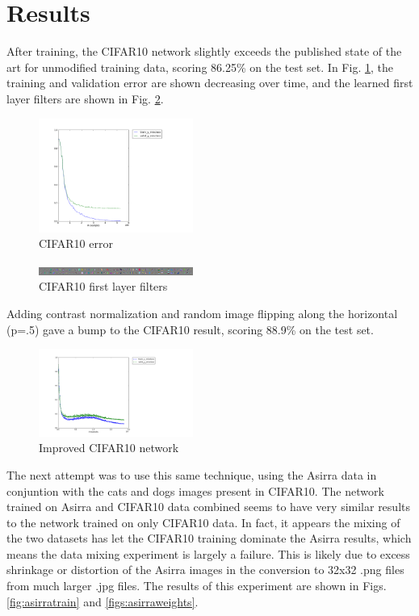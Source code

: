 \documentclass[journal]{IEEEtran}
\begin{document}
\section{Results}
After training, the CIFAR10 network slightly exceeds the published state of the
art for unmodified training data, scoring 86.25\% on the test set. In Fig. 
\ref{fig:cifartrain}, the training and validation error are shown decreasing
over time, and the learned first layer filters are shown in Fig. 
\ref{fig:cifarweights}.

\begin{figure}[h!]
\centering
  \includegraphics[width=0.45\textwidth]{cifartrain.png}
  \caption{CIFAR10 error}
\label{fig:cifartrain}
\end{figure}

\begin{figure}[h!]
\centering
  \includegraphics[width=0.45\textwidth]{cifarweights.png}
  \caption{CIFAR10 first layer filters}
\label{fig:cifarweights}
\end{figure}

Adding contrast normalization and random image flipping along the horizontal
(p=.5) gave a bump to the CIFAR10 result, scoring 88.9\% on the test set. 

\begin{figure}[h!]
\centering
  \includegraphics[width=0.45\textwidth]{cifar10.png}
  \caption{Improved CIFAR10 network \cite{Lowresource}}
\label{fig:cifar10}
\end{figure}

The next attempt was to use this same technique, using the Asirra data in 
conjuntion with the cats and dogs images present in CIFAR10.
The network trained on Asirra and CIFAR10 data combined seems to have very 
similar results to the network trained on only CIFAR10 data. In fact, it 
appears the mixing of the two datasets has let the CIFAR10 training dominate
the Asirra results, which means the data mixing experiment is largely a 
failure. This is likely due to excess shrinkage or distortion of the Asirra 
images in the conversion to 32x32 .png files from much larger .jpg files.
The results of this experiment are shown in Figs. \ref{fig:asirratrain} and 
\ref{figs:asirraweights}.
\end{document}
